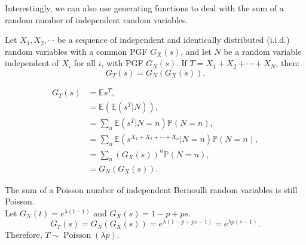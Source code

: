 \documentclass{huhtakm-template-book-v2}
\newcommand{\prob}{\mathbb{P}}
\newcommand{\expect}{\mathbb{E}}
\DeclareMathOperator{\Poisson}{Poisson}
\begin{document}
    Interestingly, we can also use generating functions to deal with the sum of a random number of independent random variables.
    \begin{thm}
        Let $X_{1},X_{2},\cdots$ be a sequence of independent and identically distributed (i.i.d.) random variables with a common PGF $G_{X}(s)$, and let $N$ be a random variable independent of $X_{i}$ for all $i$, with PGF $G_{N}(s)$. If $T = X_{1}+X_{2}+\cdots+X_{N}$, then:
        \begin{equation*}
            G_{T}(s) = G_{N}(G_{X}(s)).
        \end{equation*}
    \end{thm}
    \begin{proofing}
        \begin{align*}
            G_{T}(s) &= \expect{s^{T}},\\
            &= \expect(\expect(s^{T}|N)),\\
            &= \sum_{n}\expect(s^{T}|N = n)\prob(N = n),\\
            &= \sum_{n}\expect(s^{X_{1}+X_{2}+\cdots+X_{n}}|N = n)\prob(N = n),\\
            &= \sum_{n}(G_{X}(s))^{n}\prob(N = n),\\
            &= G_{N}(G_{X}(s)).
        \end{align*}
    \end{proofing}
    \begin{eg}
        The sum of a Poisson number of independent Bernoulli random variables is still Poisson.\\
        Let $G_{N}(t) = e^{\lambda(t-1)}$ and $G_{X}(s) = 1-p+ps$.
        \begin{equation*}
            G_{T}(s) = G_{N}(G_{X}(s)) = e^{\lambda(1-p+ps-1)} = e^{\lambda p(s-1)}.
        \end{equation*}
        Therefore, $T \sim \Poisson(\lambda p)$.
    \end{eg}
    \newpage
\end{document}

